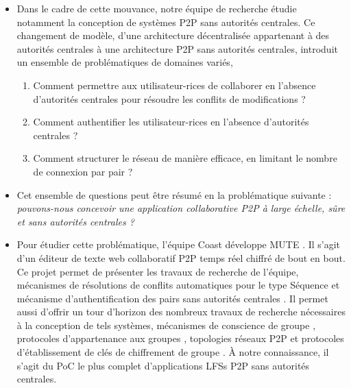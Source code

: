 \begin{itemize}
    \item Dans le cadre de cette mouvance, notre équipe de recherche étudie notamment la conception de systèmes \ac{P2P} sans autorités centrales.
        Ce changement de modèle, d'une architecture décentralisée appartenant à des autorités centrales à une architecture \ac{P2P} sans autorités centrales, introduit un ensemble de problématiques de domaines variés, \eg
        \begin{enumerate}
            \item Comment permettre aux utilisateur-rices de collaborer en l'absence d'autorités centrales pour résoudre les conflits de modifications ?
            \item Comment authentifier les utilisateur-rices en l'absence d'autorités centrales ?
            \item Comment structurer le réseau de manière efficace, \ie en limitant le nombre de connexion par pair ?
        \end{enumerate}
    \item Cet ensemble de questions peut être résumé en la problématique suivante : \emph{pouvons-nous concevoir une application collaborative \ac{P2P} à large échelle, sûre et sans autorités centrales ?}
    \item Pour étudier cette problématique, l'équipe Coast développe \acf{MUTE} \cite{MUTE2017}.
        Il s'agit d'un éditeur de texte web collaboratif \ac{P2P} temps réel chiffré de bout en bout.
        Ce projet permet de présenter les travaux de recherche de l'équipe, \ie mécanismes de résolutions de conflits automatiques pour le type Séquence \cite{2013-logootsplit,2021-these-vic,2022-rls-tpds-nicolas} et mécanisme d'authentification des pairs sans autorités centrales \cite{2018-trusternity-short,2018-trusternity-long}.
        Il permet aussi d'offrir un tour d'horizon des nombreux travaux de recherche nécessaires à la conception de tels systèmes, \ie mécanismes de conscience de groupe , protocoles d'appartenance aux groupes \cite{swim2002, lifeguard2018}, topologies réseaux \ac{P2P} \cite{2018-spray-nedelec} et protocoles d'établissement de clés de chiffrement de groupe \cite{1995-burmester-desmedt}.
        À notre connaissance, il s'agit du \acf{PoC} le plus complet d'applications \acp{LFS} \ac{P2P} sans autorités centrales.
\end{itemize}
